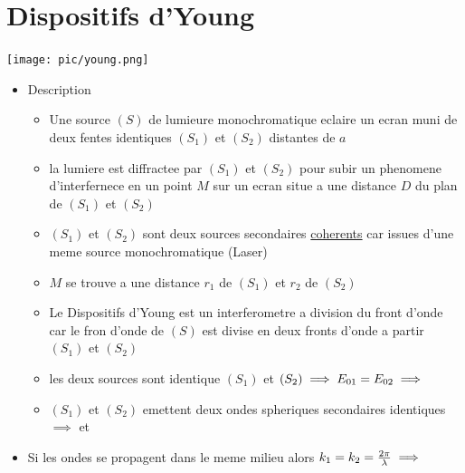 \documentclass[12pt]{book}
\begin{document}
        \section{Dispositifs d'Young}
            \begin{center}
                \texttt{[image: pic/young.png]}
            \end{center}
            \begin{itemize}
               \item Description \\
                    \begin{itemize}
                        \item Une source $(S)$ de lumieure monochromatique eclaire un ecran muni de deux fentes identiques $(S_1)$ et $(S_2)$ distantes de $a$
                        \item la lumiere est diffractee par $(S_1)$ et $(S_2)$ pour subir un phenomene d'interfernece en un point $M$ sur un ecran situe a une distance $D$ du plan de $(S_1)$ et $(S_2)$ 
                        \item $(S_1)$ et $(S_2)$ sont deux sources secondaires \underline{coherents} car issues d'une meme source monochromatique (Laser)
                        \item $M$ se trouve a une distance $r_1$ de $(S_1)$ et $r_2$ de $(S_2)$
                        \item Le Dispositifs d'Young est un interferometre a division du front d'onde car le fron d'onde de $(S)$ est divise en deux fronts d'onde a partir $(S_1)$ et $(S_2)$
                        \item les deux sources sont identique $(S_1)$ et $(S_2) \\
                         \implies  E_{01}=E_{02} \implies$
                        \item $(S_1)$ et $(S_2)$ emettent deux ondes spheriques secondaires identiques \\ $\implies $  et  
                    \end{itemize}
                \item Si les ondes se propagent dans le meme milieu alors $k_1 = k_2=\frac{2\pi}{\lambda} \\ \implies $

\end{itemize}
\end{document}
